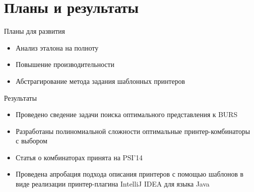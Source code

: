 \documentclass[sans]{beamer}
\begin{document}
\section{Планы и результаты}

\begin{frame}{Планы для развития}
  \begin{itemize}
    \item Анализ эталона на полноту
    \item Повышение производительности
    \item Абстрагирование метода задания шаблонных принтеров
  \end{itemize}
\end{frame}

\begin{frame}{Результаты}
  \begin{itemize}
    \small
    \item Проведено сведение задачи поиска оптимального представления к BURS
      \vfill
    \item Разработаны полиномиальной сложности оптимальные принтер-комбинаторы с выбором
      \vfill
    \item Статья о комбинаторах принята на PSI'14
      \vfill
    \item Проведена апробация подхода описания принтеров с помощью шаблонов
       в виде реализации принтер-плагина IntelliJ IDEA для языка Java
  \end{itemize}
  
\end{frame}
\end{document}
